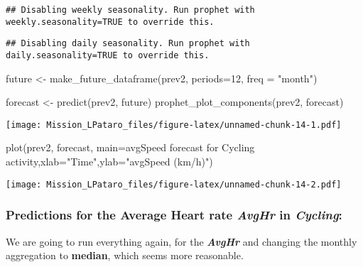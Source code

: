 \documentclass[
]{article}
\newenvironment{Shaded}{\begin{snugshade}}{\end{snugshade}}
\newcommand{\AttributeTok}[1]{\textcolor[rgb]{0.77,0.63,0.00}{#1}}
\newcommand{\DecValTok}[1]{\textcolor[rgb]{0.00,0.00,0.81}{#1}}
\newcommand{\FunctionTok}[1]{\textcolor[rgb]{0.00,0.00,0.00}{#1}}
\newcommand{\NormalTok}[1]{#1}
\newcommand{\OtherTok}[1]{\textcolor[rgb]{0.56,0.35,0.01}{#1}}
\newcommand{\StringTok}[1]{\textcolor[rgb]{0.31,0.60,0.02}{#1}}
\begin{document}
\begin{verbatim}
## Disabling weekly seasonality. Run prophet with weekly.seasonality=TRUE to override this.
\end{verbatim}

\begin{verbatim}
## Disabling daily seasonality. Run prophet with daily.seasonality=TRUE to override this.
\end{verbatim}

\begin{Shaded}
\begin{Highlighting}[]
\NormalTok{future }\OtherTok{\textless{}{-}} \FunctionTok{make\_future\_dataframe}\NormalTok{(prev2, }\AttributeTok{periods=}\DecValTok{12}\NormalTok{, }\AttributeTok{freq =} \StringTok{"month"}\NormalTok{)}

\NormalTok{forecast }\OtherTok{\textless{}{-}} \FunctionTok{predict}\NormalTok{(prev2, future)}
\FunctionTok{prophet\_plot\_components}\NormalTok{(prev2, forecast)}
\end{Highlighting}
\end{Shaded}

\texttt{[image: Mission\_LPataro\_files/figure-latex/unnamed-chunk-14-1.pdf]}

\begin{Shaded}
\begin{Highlighting}[]
\FunctionTok{plot}\NormalTok{(prev2, forecast, }\AttributeTok{main=}\StringTok{\textquotesingle{}avgSpeed forecast for Cycling activity\textquotesingle{}}\NormalTok{,}\AttributeTok{xlab=}\StringTok{"Time"}\NormalTok{,}\AttributeTok{ylab=}\StringTok{"avgSpeed (km/h)"}\NormalTok{)}
\end{Highlighting}
\end{Shaded}

\texttt{[image: Mission\_LPataro\_files/figure-latex/unnamed-chunk-14-2.pdf]}

\hypertarget{predictions-for-the-average-heart-rate-avghr-in-cycling}{%
\subsubsection{\texorpdfstring{Predictions for the Average Heart rate
\emph{AvgHr} in
\emph{Cycling}:}{Predictions for the Average Heart rate AvgHr in Cycling:}}\label{predictions-for-the-average-heart-rate-avghr-in-cycling}}

We are going to run everything again, for the \textbf{\emph{AvgHr}} and
changing the monthly aggregation to \textbf{median}, which seems more
reasonable.
\end{document}
